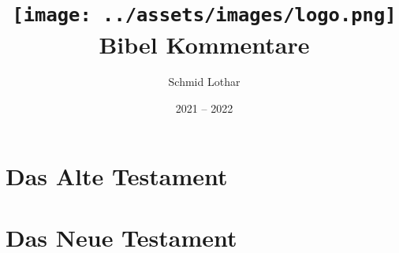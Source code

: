 \documentclass{../inc/mybibbook}
\author{Schmid Lothar}
\date{2021 -- 2022}
\title{
    \texttt{[image: ../assets/images/logo.png]}\\
    \textbf{Bibel Kommentare}
}
\begin{document}
\maketitle
\tableofcontents

\newpage


\chapter{Das Alte Testament}

\chapter{Das Neue Testament}
%

\end{document}
